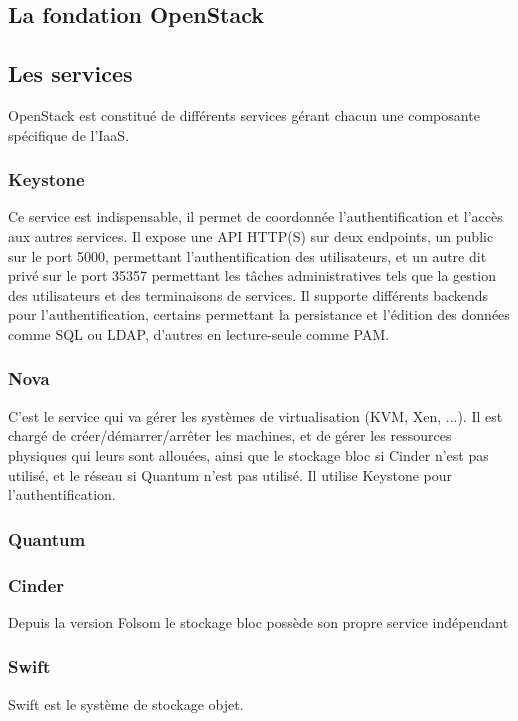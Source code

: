 \documentclass[a4paper,oneside]{report}
\begin{document}
\subsection{La fondation OpenStack}


\subsection{Les services}
OpenStack est constitué de différents services gérant chacun une composante spécifique de l'IaaS.
\subsubsection{Keystone}
Ce service est indispensable, il permet de coordonnée l'authentification et l'accès aux autres services.\newline
Il expose une API HTTP(S) sur deux endpoints, un public sur le port 5000, permettant l'authentification des utilisateurs, et un autre dit privé sur le port 35357 permettant les tâches administratives tels que la gestion des utilisateurs et des terminaisons de services.
Il supporte différents backends pour l'authentification, certains permettant la persistance et l'édition des données comme SQL ou LDAP, d'autres en lecture-seule comme PAM.\newline

\subsubsection{Nova}
C'est le service qui va gérer les systèmes de virtualisation (KVM, Xen, ...).
Il est chargé de créer/démarrer/arrêter les machines, et de gérer les ressources physiques qui leurs sont allouées, ainsi que le stockage bloc si Cinder n'est pas utilisé, et le réseau si Quantum n'est pas utilisé.\newline
Il utilise Keystone pour l'authentification.


\subsubsection{Quantum}


\subsubsection{Cinder}
Depuis la version Folsom le stockage bloc possède son propre service indépendant 



\subsubsection{Swift}
Swift est le système de stockage objet. 
\end{document}
